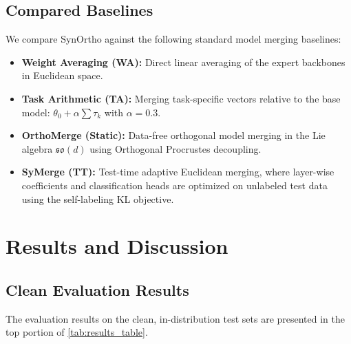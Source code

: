 \documentclass{article}
\theoremstyle{plain}
\theoremstyle{definition}
\theoremstyle{remark}
\begin{document}
\subsection{Compared Baselines}
We compare SynOrtho against the following standard model merging baselines:
\begin{itemize}
    \item \textbf{Weight Averaging (WA):} Direct linear averaging of the expert backbones in Euclidean space.
    \item \textbf{Task Arithmetic (TA):} Merging task-specific vectors relative to the base model: $\theta_0 + \alpha \sum \tau_k$ with $\alpha = 0.3$.
    \item \textbf{OrthoMerge (Static):} Data-free orthogonal model merging in the Lie algebra $\mathfrak{so}(d)$ using Orthogonal Procrustes decoupling.
    \item \textbf{SyMerge (TT):} Test-time adaptive Euclidean merging, where layer-wise coefficients and classification heads are optimized on unlabeled test data using the self-labeling KL objective.
\end{itemize}

\section{Results and Discussion}
\label{submission-results}

\subsection{Clean Evaluation Results}
The evaluation results on the clean, in-distribution test sets are presented in the top portion of \cref{tab:results_table}. 
\end{document}
